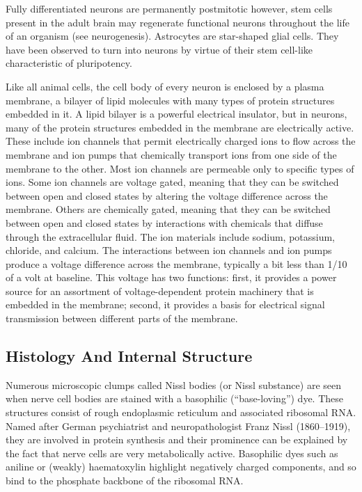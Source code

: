 Fully differentiated neurons are permanently postmitotic however, stem cells present in the adult brain may regenerate functional neurons throughout the life of an organism (see neurogenesis). Astrocytes are star-shaped glial cells. They have been observed to turn into neurons by virtue of their stem cell-like characteristic of pluripotency.

Like all animal cells, the cell body of every neuron is enclosed by a plasma membrane, a bilayer of lipid molecules with many types of protein structures embedded in it. A lipid bilayer is a powerful electrical insulator, but in neurons, many of the protein structures embedded in the membrane are electrically active. These include ion channels that permit electrically charged ions to flow across the membrane and ion pumps that chemically transport ions from one side of the membrane to the other. Most ion channels are permeable only to specific types of ions. Some ion channels are voltage gated, meaning that they can be switched between open and closed states by altering the voltage difference across the membrane. Others are chemically gated, meaning that they can be switched between open and closed states by interactions with chemicals that diffuse through the extracellular fluid. The ion materials include sodium, potassium, chloride, and calcium. The interactions between ion channels and ion pumps produce a voltage difference across the membrane, typically a bit less than 1/10 of a volt at baseline. This voltage has two functions: first, it provides a power source for an assortment of voltage-dependent protein machinery that is embedded in the membrane; second, it provides a basis for electrical signal transmission between different parts of the membrane.

\hypertarget{histology-and-internal-structure}{%
\subsection{Histology And Internal Structure}\label{histology-and-internal-structure}}

Numerous microscopic clumps called Nissl bodies (or Nissl substance) are seen when nerve cell bodies are stained with a basophilic (``base-loving'') dye. These structures consist of rough endoplasmic reticulum and associated ribosomal RNA. Named after German psychiatrist and neuropathologist Franz Nissl (1860--1919), they are involved in protein synthesis and their prominence can be explained by the fact that nerve cells are very metabolically active. Basophilic dyes such as aniline or (weakly) haematoxylin highlight negatively charged components, and so bind to the phosphate backbone of the ribosomal RNA.

